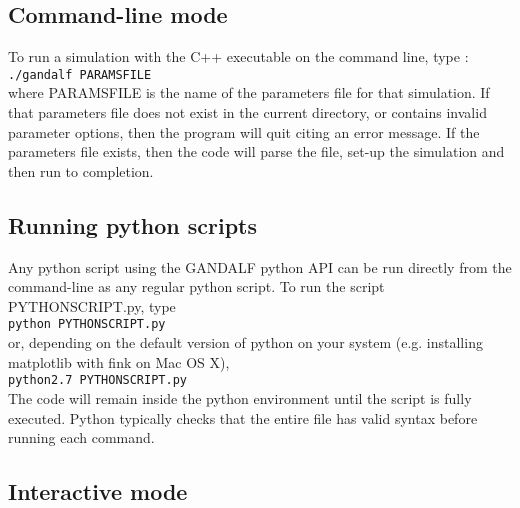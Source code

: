 \documentclass[a4paper]{article}
\newcommand{\var}[1]{\texttt{#1}}
\begin{document}
\subsection{Command-line mode}

\noindent To run a simulation with the C++ executable on the command line, type : \\
\newline
\var{./gandalf PARAMSFILE} \\
\newline
where PARAMSFILE is the name of the parameters file for that simulation.  If that parameters file does not exist in the current directory, or contains invalid parameter options, then the program will quit citing an error message.  If the parameters file exists, then the code will parse the file, set-up the simulation and then run to completion.



\subsection{Running python scripts}

\noindent Any python script using the GANDALF python API can be run directly from the command-line as any regular python script.  To run the script PYTHONSCRIPT.py, type \\
\newline
\var{python PYTHONSCRIPT.py} \\
\newline
or, depending on the default version of python on your system (e.g. installing matplotlib with fink on Mac OS X), \\
\newline
\var{python2.7 PYTHONSCRIPT.py} \\
\newline
The code will remain inside the python environment until the script is fully executed.  Python typically checks that the entire file has valid syntax before running each command.



\subsection{Interactive mode}
\end{document}
